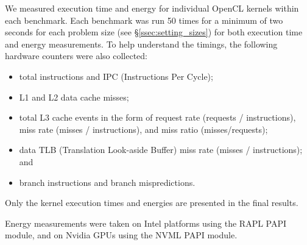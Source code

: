 \documentclass[../document.tex]{subfiles}
\begin{document}
\label{ssec:measurements}


We measured execution time and energy for individual OpenCL kernels within each benchmark.
Each benchmark was run 50 times for a minimum of two seconds for each problem size (see \S\ref{ssec:setting_sizes}) for both execution time and energy measurements.
To help understand the timings, the following hardware counters were also collected:
\begin{itemize}
	\item total instructions and IPC (Instructions Per Cycle);
	\item L1 and L2 data cache misses;
	\item total L3 cache events in the form of request rate (requests / instructions), miss rate (misses / instructions), and miss ratio (misses/requests);
	\item data TLB (Translation Look-aside Buffer) miss rate (misses / instructions); and
	\item branch instructions and branch mispredictions.
\end{itemize}

Only the kernel execution times and energies are presented in the final results.

Energy measurements were taken on Intel platforms using the RAPL PAPI module, and on Nvidia GPUs using the NVML PAPI module.
\end{document}
